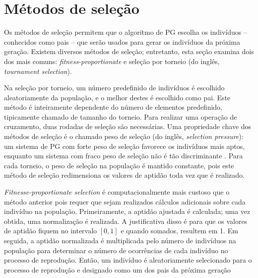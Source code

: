 \section{Métodos de seleção} \label{sec:selection-methods}
Os métodos de seleção permitem que o algoritmo de PG escolha os indivíduos -- conhecidos como pais -- que serão usados para gerar os indivíduos da próxima geração. Existem diversos métodos de seleção; entretanto, esta seção examina dois dos mais comuns: \textit{fitness-proportionate} e seleção por torneio (do inglês, \textit{tournament selection}).

Na seleção por torneio, um número predefinido de indivíduos é escolhido aleatoriamente da população, e o melhor destes é escolhido como pai. Este método é inteiramente dependente do número de elementos predefinido, tipicamente chamado de tamanho do torneio. Para realizar uma operação de cruzamento, duas rodadas de seleção são necessárias. Uma propriedade chave dos métodos de seleção é o chamado peso de seleção (do inglês, \textit{selection pressure}): um sistema de PG com forte peso de seleção favorece os indivíduos mais aptos, enquanto um sistema com fraco peso de seleção não é tão discriminante \cite{poli2008}. Para cada torneio, o peso de seleção na população é mantido constante, pois este método de seleção redimensiona os valores de aptidão toda vez que é realizado.


\textit{Fitnesse-proportionate selection} é computacionalmente mais custoso que o método anterior pois requer que sejam realizados cálculos adicionais sobre cada indivíduo na população. Primeiramente, a aptidão ajustada é calculada; uma vez obtida, uma normalização é realizada. A justificativa disso é para que os valores de aptidão fiquem no intervalo $[0, 1]$ e quando somados, resultem em 1. Em seguida, a aptidão normalizada é multiplicada pelo número de indivíduos na população para determinar o número de ocorrências de cada indivíduo no processo de reprodução. Então, um indivíduo é aleatoriamente selecionado para o processo de reprodução e designado como um dos pais da próxima geração

